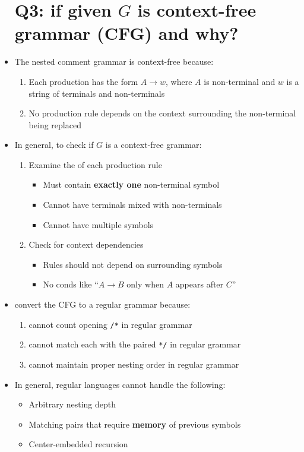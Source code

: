 \begin{itemize}
\section*{Q3: if given $G$ is context-free grammar (CFG) and why?}
\item The nested comment grammar is context-free because:
  \begin{enumerate}
  \item Each production has the form $A\to w$, where $A$ is non-terminal and $w$ is a string of terminals and non-terminals
  \item No production rule depends on the context surrounding the non-terminal being replaced
  \end{enumerate}
\item In general, to check if $G$ is a context-free grammar:
  \begin{enumerate}
  \item Examine the  of each production rule
    \begin{itemize}
    \item Must contain \textbf{exactly one} non-terminal symbol
    \item Cannot have terminals mixed with non-terminals
    \item Cannot have multiple symbols
    \end{itemize}
  \item Check for context dependencies
    \begin{itemize}
    \item Rules should not depend on surrounding symbols
    \item No conds like ``$A\to B$ only when $A$ appears after $C$''
    \end{itemize}
  \end{enumerate}
\item {} convert the CFG to a regular grammar because:
  \begin{enumerate}
  \item cannot count opening \texttt{/*} in regular grammar
  \item cannot match each with the paired \texttt{*/} in regular grammar
  \item cannot maintain proper nesting order in regular grammar
  \end{enumerate}
\item In general, regular languages cannot handle the following:
  \begin{itemize}[leftmargin=1em]
  \item Arbitrary nesting depth
  \item Matching pairs that require \textbf{memory} of previous symbols
  \item Center-embedded recursion
  \end{itemize}
\end{itemize}

